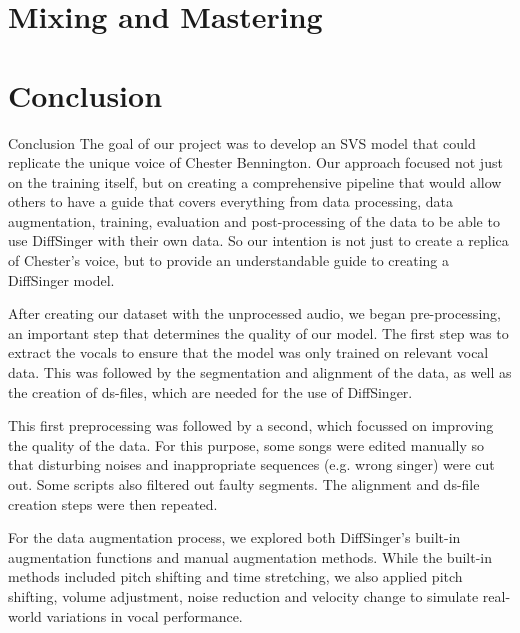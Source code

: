 \documentclass[a4paper]{article}
\begin{document}
\section*{Mixing and Mastering}



\section*{Conclusion}

Conclusion
The goal of our project was to develop an SVS model that could replicate the unique voice of Chester Bennington. Our approach focused not just on the training itself, but on creating a comprehensive pipeline that would allow others to have a guide that covers everything from data processing, data augmentation, training, evaluation and post-processing of the data to be able to use DiffSinger with their own data. So our intention is not just to create a replica of Chester's voice, but to provide an understandable guide to creating a DiffSinger model.

After creating our dataset with the unprocessed audio, we began pre-processing, an important step that determines the quality of our model. The first step was to extract the vocals to ensure that the model was only trained on relevant vocal data. This was followed by the segmentation and alignment of the data, as well as the creation of ds-files, which are needed for the use of DiffSinger.

This first preprocessing was followed by a second, which focussed on improving the quality of the data. For this purpose, some songs were edited manually so that disturbing noises and inappropriate sequences (e.g. wrong singer) were cut out. Some scripts also filtered out faulty segments. The alignment and ds-file creation steps were then repeated.

For the data augmentation process, we explored both DiffSinger's built-in augmentation functions and manual augmentation methods. While the built-in methods included pitch shifting and time stretching, we also applied pitch shifting, volume adjustment, noise reduction and velocity change to simulate real-world variations in vocal performance.
\end{document}

